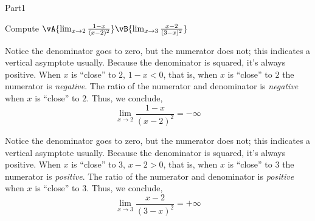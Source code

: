 \documentclass{article}
\begin{document}
\begin{exam}{Part1}
\begin{problem}[3]
Compute $\vA{\lim_{x\to2} \frac{1-x}{(x-2)^2}}
    \vB{\lim_{x\to3} \frac{x-2}{(3-x)^2}}$

\begin{solution}[1in]
\begin{verA}
Notice the denominator goes to zero, but the numerator does not;
this indicates a vertical asymptote usually. Because the
denominator is squared, it's always positive. When $x$ is
``close'' to $2$, $1 - x < 0$, that is, when $x$ is ``close'' to
$2$ the numerator is \emph{negative}. The ratio of the numerator and
denominator is \emph{negative} when $x$ is ``close'' to $2$. Thus, we
conclude,
\[
        \boxed{\lim_{x\to2} \frac{1-x}{(x-2)^2} = -\infty}
\]
\end{verA}
\begin{verB}
Notice the denominator goes to zero, but the numerator does not;
this indicates a vertical asymptote usually. Because the
denominator is squared, it's always positive. When $x$ is
``close'' to $3$, $x - 2 > 0$, that is, when $x$ is ``close'' to
$3$ the numerator is \emph{positive}. The ratio of the numerator and
denominator is \emph{positive} when $x$ is ``close'' to $3$. Thus, we
conclude,
\[
        \boxed{\lim_{x\to3} \frac{x-2}{(3-x)^2} = +\infty}
\]
\end{verB}
\ifkeyalt\adjDisplayBelow\fi
\end{solution}
\end{problem}

\end{exam}
\end{document}
